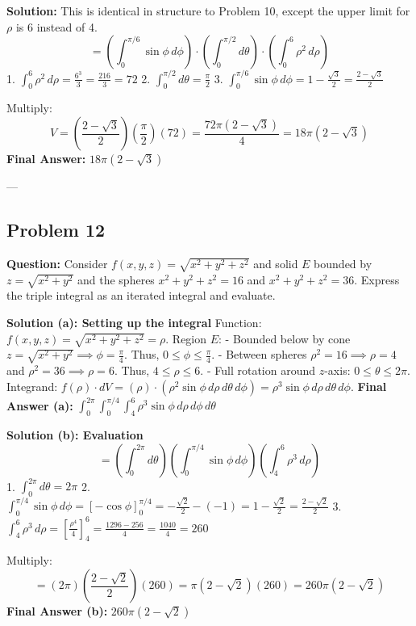 \documentclass[12pt]{article}
\begin{document}
\textbf{Solution:}
This is identical in structure to Problem 10, except the upper limit for $\rho$ is 6 instead of 4.
\[ = \left( \int_0^{\pi/6} \sin\phi \, d\phi \right) \cdot \left( \int_0^{\pi/2} d\theta \right) \cdot \left( \int_0^6 \rho^2 \, d\rho \right) \]
1. $\int_0^6 \rho^2 \, d\rho = \frac{6^3}{3} = \frac{216}{3} = 72$
2. $\int_0^{\pi/2} d\theta = \frac{\pi}{2}$
3. $\int_0^{\pi/6} \sin\phi \, d\phi = 1 - \frac{\sqrt{3}}{2} = \frac{2-\sqrt{3}}{2}$

Multiply:
\[ V = \left( \frac{2-\sqrt{3}}{2} \right) \left( \frac{\pi}{2} \right) (72) = \frac{72\pi(2-\sqrt{3})}{4} = 18\pi(2-\sqrt{3}) \]
\textbf{Final Answer:} $18\pi(2-\sqrt{3})$

---

\subsection*{Problem 12}
\textbf{Question:} Consider $f(x, y, z) = \sqrt{x^2+y^2+z^2}$ and solid $E$ bounded by $z = \sqrt{x^2+y^2}$ and the spheres $x^2+y^2+z^2=16$ and $x^2+y^2+z^2=36$. Express the triple integral as an iterated integral and evaluate.

\textbf{Solution (a): Setting up the integral}
Function: $f(x,y,z) = \sqrt{x^2+y^2+z^2} = \rho$.
Region $E$:
- Bounded below by cone $z = \sqrt{x^2+y^2} \implies \phi = \frac{\pi}{4}$. Thus, $0 \le \phi \le \frac{\pi}{4}$.
- Between spheres $\rho^2=16 \implies \rho=4$ and $\rho^2=36 \implies \rho=6$. Thus, $4 \le \rho \le 6$.
- Full rotation around $z$-axis: $0 \le \theta \le 2\pi$.
Integrand: $f(\rho) \cdot dV = (\rho) \cdot (\rho^2 \sin\phi \, d\rho \, d\theta \, d\phi) = \rho^3 \sin\phi \, d\rho \, d\theta \, d\phi$.
\textbf{Final Answer (a):} $\int_0^{2\pi} \int_0^{\pi/4} \int_4^6 \rho^3 \sin\phi \, d\rho \, d\phi \, d\theta$

\textbf{Solution (b): Evaluation}
\[ = \left( \int_0^{2\pi} d\theta \right) \left( \int_0^{\pi/4} \sin\phi \, d\phi \right) \left( \int_4^6 \rho^3 \, d\rho \right) \]
1. $\int_0^{2\pi} d\theta = 2\pi$
2. $\int_0^{\pi/4} \sin\phi \, d\phi = [-\cos\phi]_0^{\pi/4} = -\frac{\sqrt{2}}{2} - (-1) = 1 - \frac{\sqrt{2}}{2} = \frac{2-\sqrt{2}}{2}$
3. $\int_4^6 \rho^3 \, d\rho = \left[ \frac{\rho^4}{4} \right]_4^6 = \frac{1296 - 256}{4} = \frac{1040}{4} = 260$

Multiply:
\[ = (2\pi) \left( \frac{2-\sqrt{2}}{2} \right) (260) = \pi(2-\sqrt{2})(260) = 260\pi(2-\sqrt{2}) \]
\textbf{Final Answer (b):} $260\pi(2-\sqrt{2})$
\end{document}
